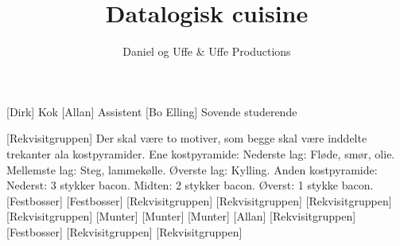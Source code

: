 \documentclass[a4paper,11pt]{article}
\title{Datalogisk cuisine}
\author{Daniel og Uffe \& Uffe Productions\texttrademark}
\begin{document}
\maketitle

\begin{roles}
[Dirk] Kok
[Allan] Assistent
[Bo Elling] Sovende studerende
\end{roles}

\begin{props}
[Rekvisitgruppen] Der skal være to motiver, som begge skal være inddelte trekanter ala kostpyramider. Ene kostpyramide: Nederste lag: Fløde, smør, olie. Mellemste lag: Steg, lammekølle. Øverste lag: Kylling. Anden kostpyramide: Nederst: 3 stykker bacon. Midten: 2 stykker bacon. Øverst: 1 stykke bacon.
[Festbosser]
[Festbosser]
[Rekvisitgruppen]
[Rekvisitgruppen]
[Rekvisitgruppen]
[Rekvisitgruppen]
[Munter]
[Munter]
[Munter]
[Allan]
[Rekvisitgruppen]
[Festbosser]
[Rekvisitgruppen]
[Rekvisitgruppen]
\end{props}
\end{document}
